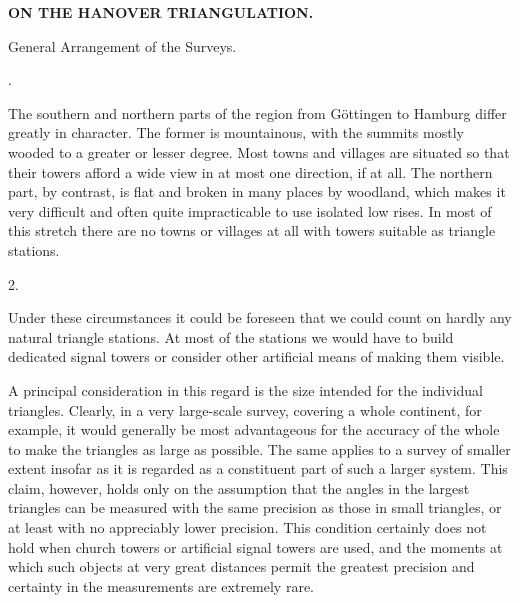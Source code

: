 \noindent\null\hfill{\small\textbf{ON THE HANOVER TRIANGULATION.}}\hfill{}\par\medskip
\begin{center}
\par\smallskip
General Arrangement of the Surveys.\par{}.
\end{center}

\par\noindent\hspace*{\parindent}The southern and northern parts of the region from Göttingen to Hamburg
differ greatly in character. The former is mountainous, with the summits
mostly wooded to a greater or lesser degree. Most towns and villages are
situated so that their towers afford a wide view in at most one direction,
if at all. The northern part, by contrast, is flat and broken in many places by
woodland, which makes it very difficult and often quite impracticable to use
isolated low rises. In most of this stretch there are no towns or villages at all
with towers suitable as triangle stations.

\begin{center}
2.
\end{center}

\par\noindent\hspace*{\parindent}Under these circumstances it could be foreseen that we could count on
hardly any natural triangle stations. At most of the stations we would have
to build dedicated signal towers or consider other artificial means of making
them visible.

\par\noindent\hspace*{\parindent}A principal consideration in this regard is the size intended for the
individual triangles. Clearly, in a very large-scale survey, covering a whole
continent, for example, it would generally be most advantageous for the
accuracy of the whole to make the triangles as large as possible. The same
applies to a survey of smaller extent insofar as it is regarded as a constituent
part of such a larger system. This claim, however, holds only on the assumption
that the angles in the largest triangles can be measured with the same precision
as those in small triangles, or at least with no appreciably lower precision.
This condition certainly does not hold when church towers or artificial
signal towers are used, and the moments at which such objects at very great
distances permit the greatest precision and certainty in the measurements
are extremely rare.

